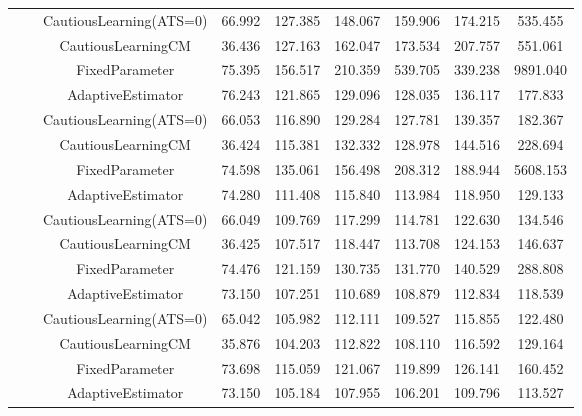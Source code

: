 \begin{table}[!h]
\begin{tabular}[t]{ccccccccc}
 &  & CautiousLearning(ATS=0) & 66.992 & 127.385 & 148.067 & 159.906 & 174.215 & 535.455\\

 &  & CautiousLearningCM & 36.436 & 127.163 & 162.047 & 173.534 & 207.757 & 551.061\\

 & \multirow[t]{-4}{*}{\centering\arraybackslash 0.35} & FixedParameter & 75.395 & 156.517 & 210.359 & 539.705 & 339.238 & 9891.040\\
\cmidrule{2-9}
 &  & AdaptiveEstimator & 76.243 & 121.865 & 129.096 & 128.035 & 136.117 & 177.833\\

 &  & CautiousLearning(ATS=0) & 66.053 & 116.890 & 129.284 & 127.781 & 139.357 & 182.367\\

 &  & CautiousLearningCM & 36.424 & 115.381 & 132.332 & 128.978 & 144.516 & 228.694\\

 & \multirow[t]{-4}{*}{\centering\arraybackslash 0.50} & FixedParameter & 74.598 & 135.061 & 156.498 & 208.312 & 188.944 & 5608.153\\
\cmidrule{2-9}
 &  & AdaptiveEstimator & 74.280 & 111.408 & 115.840 & 113.984 & 118.950 & 129.133\\

 &  & CautiousLearning(ATS=0) & 66.049 & 109.769 & 117.299 & 114.781 & 122.630 & 134.546\\

 &  & CautiousLearningCM & 36.425 & 107.517 & 118.447 & 113.708 & 124.153 & 146.637\\

 & \multirow[t]{-4}{*}{\centering\arraybackslash 0.75} & FixedParameter & 74.476 & 121.159 & 130.735 & 131.770 & 140.529 & 288.808\\
\cmidrule{2-9}
 &  & AdaptiveEstimator & 73.150 & 107.251 & 110.689 & 108.879 & 112.834 & 118.539\\

 &  & CautiousLearning(ATS=0) & 65.042 & 105.982 & 112.111 & 109.527 & 115.855 & 122.480\\

 &  & CautiousLearningCM & 35.876 & 104.203 & 112.822 & 108.110 & 116.592 & 129.164\\

 & \multirow[t]{-4}{*}{\centering\arraybackslash 1.00} & FixedParameter & 73.698 & 115.059 & 121.067 & 119.899 & 126.141 & 160.452\\
\cmidrule{2-9}
 &  & AdaptiveEstimator & 73.150 & 105.184 & 107.955 & 106.201 & 109.796 & 113.527\\


\end{tabular}
\end{table}
